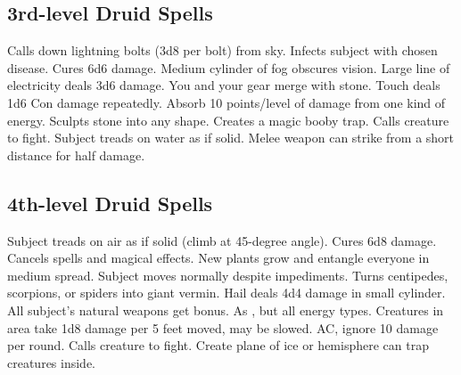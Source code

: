 \subsection{3rd-level Druid Spells}
\begin{spelllist}
   Calls down lightning bolts (3d8 per bolt) from sky.
   Infects subject with chosen disease.
   Cures 6d6 damage.
   Medium cylinder of fog obscures vision.
   Large line of electricity deals 3d6 damage.
   You and your gear merge with stone.
   Touch deals 1d6 Con damage repeatedly.
   Absorb 10 points/level of damage from one kind of energy.
   Sculpts stone into any shape.
   Creates a magic booby trap.
   Calls creature to fight.
   Subject treads on water as if solid.
   Melee weapon can strike from a short distance for half damage.
\end{spelllist}

\subsection{4th-level Druid Spells}
\begin{spelllist}
   Subject treads on air as if solid (climb at 45-degree angle).
   Cures 6d8 damage.
   Cancels spells and magical effects.
   New plants grow and entangle everyone in medium spread.
   Subject moves normally despite impediments.
   Turns centipedes, scorpions, or spiders into giant vermin.
   Hail deals 4d4 damage in small cylinder.
   All subject's natural weapons get  bonus.
   As , but all energy types.
   Creatures in area take 1d8 damage per 5 feet moved, may be slowed.
    AC, ignore 10 damage per round.
   Calls creature to fight.
   Create plane of ice or hemisphere can trap creatures inside.
\end{spelllist}

